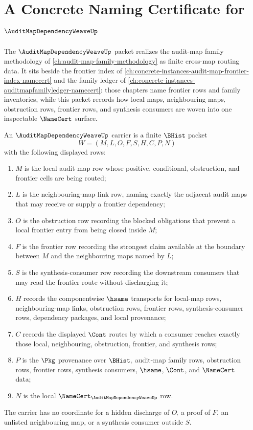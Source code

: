 \chapter{A Concrete Naming Certificate for $\AuditMapDependencyWeaveUp$}
\label{ch:concrete-instances-auditmapdependencyweave-namecert}

The $\AuditMapDependencyWeaveUp$ packet realizes the audit-map family methodology of \autoref{ch:audit-map-family-methodology} as finite cross-map routing data. It sits beside the frontier index of \autoref{ch:concrete-instances-audit-map-frontier-index-namecert} and the family ledger of \autoref{ch:concrete-instances-auditmapfamilyledger-namecert}: those chapters name frontier rows and family inventories, while this packet records how local maps, neighbouring maps, obstruction rows, frontier rows, and synthesis consumers are woven into one inspectable $\NameCert$ surface.

\begin{definition}
\label{def:audit-map-dependency-weave-carrier}
An $\AuditMapDependencyWeaveUp$ carrier is a finite $\BHist$ packet
$$
W=(M,L,O,F,S,H,C,P,N)
$$
with the following displayed rows:
\begin{enumerate}
\item $M$ is the local audit-map row whose positive, conditional, obstruction, and frontier cells are being routed;
\item $L$ is the neighbouring-map link row, naming exactly the adjacent audit maps that may receive or supply a frontier dependency;
\item $O$ is the obstruction row recording the blocked obligations that prevent a local frontier entry from being closed inside $M$;
\item $F$ is the frontier row recording the strongest claim available at the boundary between $M$ and the neighbouring maps named by $L$;
\item $S$ is the synthesis-consumer row recording the downstream consumers that may read the frontier route without discharging it;
\item $H$ records the componentwise $\hsame$ transports for local-map rows, neighbouring-map links, obstruction rows, frontier rows, synthesis-consumer rows, dependency packages, and local provenance;
\item $C$ records the displayed $\Cont$ routes by which a consumer reaches exactly those local, neighbouring, obstruction, frontier, and synthesis rows;
\item $P$ is the $\Pkg$ provenance over $\BHist$, audit-map family rows, obstruction rows, frontier rows, synthesis consumers, $\hsame$, $\Cont$, and $\NameCert$ data;
\item $N$ is the local $\NameCert_{\AuditMapDependencyWeaveUp}$ row.
\end{enumerate}
The carrier has no coordinate for a hidden discharge of $O$, a proof of $F$, an unlisted neighbouring map, or a synthesis consumer outside $S$.
\end{definition}


